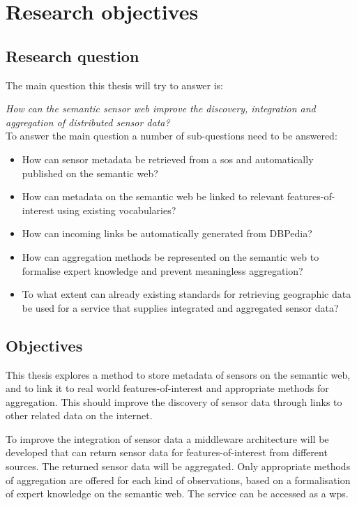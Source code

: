 
\section{Research objectives}
\label{chap:objectives}


\subsection{Research question} 
The main question this thesis will try to answer is: 

\textit{How can the semantic sensor web improve the discovery, integration and aggregation of distributed sensor data?}\\

To answer the main question a number of sub-questions need to be answered:
\begin{itemize}
	\item How can sensor metadata be retrieved from a \ac{sos} and automatically published on the semantic web?
	\item How can metadata on the semantic web be linked to relevant features-of-interest using existing vocabularies?
	\item How can incoming links be automatically generated from DBPedia?
	\item How can aggregation methods be represented on the semantic web to formalise expert knowledge and prevent meaningless aggregation?
	\item To what extent can already existing standards for retrieving geographic data be used for a service that supplies integrated and aggregated sensor data?
\end{itemize}

\subsection{Objectives}

This thesis explores a method to store metadata of sensors on the semantic web, and to link it to real world features-of-interest and appropriate methods for aggregation. This should improve the discovery of sensor data through links to other related data on the internet.  

To improve the integration of sensor data a middleware architecture will be developed that can return sensor data for features-of-interest from different sources. The returned sensor data will be aggregated. Only appropriate methods of aggregation are offered for each kind of observations, based on a formalisation of expert knowledge on the semantic web. The service can be accessed as a \ac{wps}.

